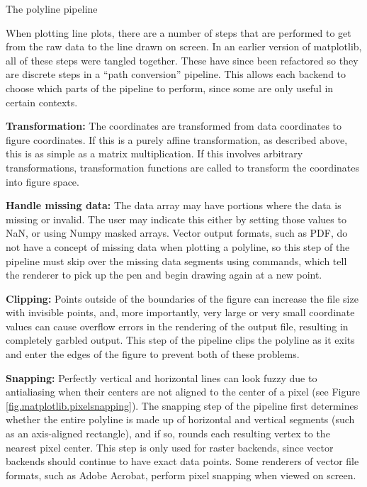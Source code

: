 \begin{aosasect1}{The polyline pipeline}

When plotting line plots, there are a number of steps that are
performed to get from the raw data to the line drawn on screen.  In an
earlier version of matplotlib, all of these steps were tangled
together.  These have since been refactored so they are discrete steps
in a ``path conversion'' pipeline.  This allows each backend to choose
which parts of the pipeline to perform, since some are only useful in
certain contexts.

\begin{aosaenumerate}

\item \textbf{Transformation:} The coordinates are transformed from data
  coordinates to figure coordinates.  If this is a purely affine
  transformation, as described above, this is as simple as a matrix
  multiplication.  If this involves arbitrary transformations,
  transformation functions are called to transform the coordinates
  into figure space.

\item \textbf{Handle missing data:} The data array may have portions
  where the data is missing or invalid.  The user may indicate this
  either by setting those values to NaN, or using Numpy masked arrays.
  Vector output formats, such as PDF, do not have a concept of missing
  data when plotting a polyline, so this step of the pipeline must
  skip over the missing data segments using  commands,
  which tell the renderer to pick up the pen and begin drawing again
  at a new point.

\item \textbf{Clipping:} Points outside of the boundaries of the
  figure can increase the file size with invisible points, and, more
  importantly, very large or very small coordinate values can cause
  overflow errors in the rendering of the output file, resulting in
  completely garbled output.  This step of the pipeline clips the
  polyline as it exits and enter the edges of the figure to prevent
  both of these problems.

\item \textbf{Snapping:} Perfectly vertical and horizontal lines can
  look fuzzy due to antialiasing when their centers are not aligned to
  the center of a pixel (see Figure
  \ref{fig.matplotlib.pixelsnapping}).  The snapping step of the
  pipeline first determines whether the entire polyline is made up of
  horizontal and vertical segments (such as an axis-aligned
  rectangle), and if so, rounds each resulting vertex to the nearest
  pixel center.  This step is only used for raster backends, since
  vector backends should continue to have exact data points.  Some
  renderers of vector file formats, such as Adobe Acrobat, perform
  pixel snapping when viewed on screen.


\end{aosaenumerate}
\end{aosasect1}
